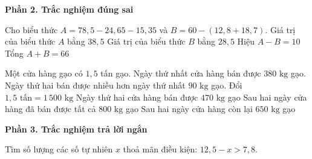 \textbf{Phần 2. Trắc nghiệm đúng sai}

\begin{ex} %
Cho biểu thức $A = 78{,}5 - 24{,}65 - 15{,}35$ và $B = 60 - (12{,}8 + 18{,}7)$.
\choiceTF
{\True Giá trị của biểu thức $A$ bằng $38{,}5$}
{\True Giá trị của biểu thức $B$ bằng $28{,}5$}
{\True Hiệu $A - B = 10$}
{Tổng $A + B = 66$}
\end{ex}

\begin{ex} %
Một cửa hàng gạo có $1{,}5$ tấn gạo. Ngày thứ nhất cửa hàng bán được $380\text{ kg}$ gạo. Ngày thứ hai bán được nhiều hơn ngày thứ nhất $90\text{ kg}$ gạo.
\choiceTF
{\True Đổi $1{,}5\text{ tấn} = 1\,500\text{ kg}$}
{\True Ngày thứ hai cửa hàng bán được $470\text{ kg}$ gạo}
{Sau hai ngày cửa hàng đã bán được tất cả $800\text{ kg}$ gạo}
{\True Sau hai ngày cửa hàng còn lại $650\text{ kg}$ gạo}
\end{ex}

\textbf{Phần 3. Trắc nghiệm trả lời ngắn}

\begin{ex} %
Tìm số lượng các số tự nhiên $x$ thoả mãn điều kiện: $12{,}5 - x > 7{,}8$.
\end{ex}

